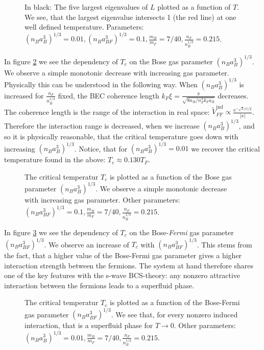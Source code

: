 \begin{figure} 
\begin{center}  
  
\caption{In black: The five largest eigenvalues of $L$ plotted as a function of $T$. We see, that the largest eigenvalue intersects 1 (the red line) at one well defined temperature. Parameters: $(n_Ba_{B}^3)^{1/3} = 0.01, (n_Ba_{BF}^3)^{1/3} = 0.1, \frac{m_B}{m_F} = 7/40, \frac{n_F}{n_B^{1/3}} = 0.215$. }
\label{fig.TCeigenvalues}  
\end{center}    
\end{figure}


In figure \ref{fig.TCrB} we see the dependency of $T_c$ on the Bose gas parameter $(n_Ba_B^3)^{1/3}$. We observe a simple monotonic decrease with increasing gas parameter. Physically this can be understood in the following way. When $(n_Ba_B^3)^{1/3}$ is increased for $\frac{n_F}{n_B^{1/3}}$ fixed, the BEC coherence length $k_F\xi = \frac{\pi}{\sqrt{8 n_B/n_F^3 k_Fa_B}}$ decreases. The coherence length is the range of the interaction in real space: $\tilde{V}_{FF}^{\text{ind}} \propto \frac{ \text{e}^{ -\sqrt{2}|x|/\xi } } {|x|}$. Therefore the interaction range is decreased, when we increase $(n_Ba_B^3)^{1/3}$, and so it is physically reasonable, that the critical temperature goes down with increasing $(n_Ba_B^3)^{1/3}$. Notice, that for $(n_Ba_{B}^3)^{1/3} = 0.01$ we recover the critical temperature found in the above: $T_c \approx 0.130 T_F$. 

\begin{figure} 
\begin{center}  
  
\caption{The critical temperatur $T_c$ is plotted as a function of the Bose gas parameter $(n_Ba_B^3)^{1/3}$. We observe a simple monotonic decrease with increasing gas parameter. Other parameters: $(n_Ba_{BF}^3)^{1/3} = 0.1, \frac{m_B}{m_F} = 7/40, \frac{n_F}{n_B^{1/3}} = 0.215$. }  
\label{fig.TCrB}  
\end{center}    
\end{figure}

In figure \ref{fig.TCrBF} we see the dependency of $T_c$ on the Bose-\textit{Fermi} gas parameter $(n_Ba_{BF}^3)^{1/3}$. We observe an increase of $T_c$ with $(n_Ba_{BF}^3)^{1/3}$. This stems from the fact, that a higher value of the Bose-Fermi gas parameter gives a higher interaction strength between the fermions. The system at hand therefore shares one of the key features with the s-wave BCS-theory: any nonzero attractive interaction between the fermions leads to a superfluid phase. 

\begin{figure} 
\begin{center}  
  
\caption{The critical temperatur $T_c$ is plotted as a function of the Bose-Fermi gas parameter $(n_Ba_{BF}^3)^{1/3}$. We see that, for every nonzero induced interaction, that is a superfluid phase for $T\to 0$. Other parameters: $(n_Ba_{B}^3)^{1/3} = 0.01, \frac{m_B}{m_F} = 7/40, \frac{n_F}{n_B^{1/3}} = 0.215$. }  
\label{fig.TCrBF}  
\end{center}    
\end{figure}



